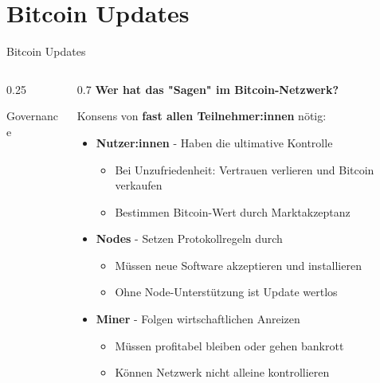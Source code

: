 \documentclass[aspectratio=169,t,11pt]{beamer}
\begin{document}
\section{Bitcoin Updates}

\begin{frame}{Bitcoin Updates}
	\begin{columns}[T]
		\begin{column}{0.25\textwidth}
			\centering
			\vspace{0.3cm}

			{\small Governance}
		\end{column}

		\begin{column}{0.7\textwidth}
			\textbf{Wer hat das "Sagen" im Bitcoin-Netzwerk?}

			\vspace{0.5em}
			Konsens von \textbf{fast allen Teilnehmer:innen} nötig:

			\begin{itemize}
				\item \textbf{Nutzer:innen} - Haben die ultimative Kontrolle
				      \begin{itemize}
					      \item Bei Unzufriedenheit: Vertrauen verlieren und Bitcoin verkaufen
					      \item Bestimmen Bitcoin-Wert durch Marktakzeptanz
				      \end{itemize}
				\item \textbf{Nodes} - Setzen Protokollregeln durch\footnotemark
				      \begin{itemize}
					      \item Müssen neue Software akzeptieren und installieren
					      \item Ohne Node-Unterstützung ist Update wertlos
				      \end{itemize}
				\item \textbf{Miner} - Folgen wirtschaftlichen Anreizen
				      \begin{itemize}
					      \item Müssen profitabel bleiben oder gehen bankrott
					      \item Können Netzwerk nicht alleine kontrollieren
				      \end{itemize}
			\end{itemize}

		\end{column}
	\end{columns}

\end{frame}
\end{document}
